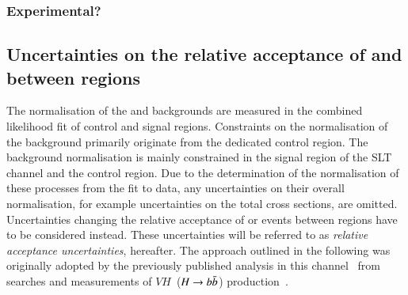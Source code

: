 

\subsubsection{Experimental?}








\subsection{Uncertainties on the relative acceptance of \ZHF and
  \ttbar between regions}

The normalisation of the \ZHF and \ttbar backgrounds are measured in
the combined likelihood fit of control and signal regions. Constraints
on the normalisation of the \ZHF background primarily originate from
the dedicated control region. The \ttbar background normalisation is
mainly constrained in the signal region of the \lephad SLT channel and
the \ZHF control region. Due to the determination of the normalisation
of these processes from the fit to data, any uncertainties on their
overall normalisation, for example uncertainties on the total cross
sections, are omitted. Uncertainties changing the relative acceptance
of \ZHF or \ttbar events between regions have to be considered
instead. These uncertainties will be referred to as \emph{relative
  acceptance uncertainties}, hereafter. The approach outlined in the
following was originally adopted by the previously published analysis
in this channel~\cite{HIGG-2016-16-witherratum} from searches and
measurements of $VH$~($H\to b\bar{b}$)
production~\cite{HIGG-2016-29,HIGG-2018-04,HIGG-2018-51}.

